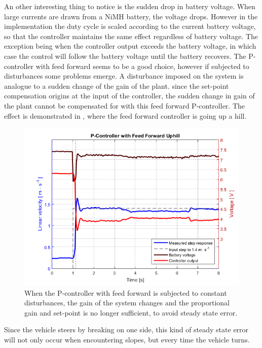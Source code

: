 An other interesting thing to notice is the sudden drop in battery voltage. When large currents are drawn from a NiMH battery, the voltage drops\cite{BatteryDS}. However in the implementation the duty cycle is scaled according to the current battery voltage, so that the controller maintains the same effect regardless of battery voltage. The exception being when the controller output exceeds the battery voltage, in which case the control will follow the battery voltage until the battery recovers.
%
The P-controller with feed forward seems to be a good choice, however if subjected to disturbances some problems emerge. A disturbance imposed on the system is analogue to a sudden change of the gain of the plant. since the set-point compensation origins at the input of the controller, the sudden change in gain of the plant cannot be compensated for with this feed forward P-controller.
%
The effect is demonstrated in , where the feed forward controller is going up a hill.
%
\begin{figure}[H]
 	\centering
 	\includegraphics[width=.9\textwidth]{figures/hillPfeedForward}
 	\caption{When the P-controller with feed forward is subjected to constant disturbances, the gain of the system changes and the proportional gain and set-point is no longer sufficient, to avoid steady state error.}
 	\label{fig:hillPfeedForward}
\end{figure}
%
Since the vehicle steers by breaking on one side, this kind of steady state error will not only occur when encountering slopes, but every time the vehicle turns.
%
